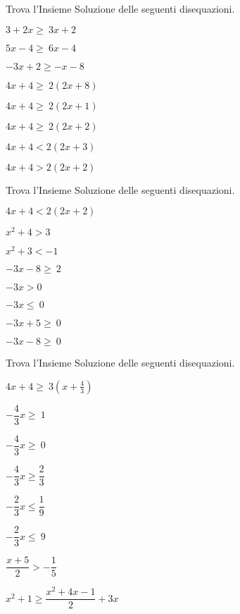 \begin{esercizio}[\Ast]
 \label{ese:21.11}
Trova l'Insieme Soluzione delle seguenti disequazioni.
 \begin{multicols}{2}
 \begin{enumeratea}
 \item \(3+2x\ge~3x+2\)
\item \(5x-4\ge~6x-4\)
\item \(-3x+2\ge -x-8\)
\item \(4x+4\ge~2(2x+8)\)
\item \(4x+4\ge~2(2x+1)\)
\item \(4x+4\ge~2(2x+2)\)
\item \(4x+4<2(2x+3)\)
\item \(4x+4>2(2x+2)\)
\end{enumeratea}
\end{multicols}
\end{esercizio}

\begin{esercizio}[\Ast]
 \label{ese:21.12}
Trova l'Insieme Soluzione delle seguenti disequazioni.
 \begin{multicols}{2}
 \begin{enumeratea}
 \item \(4x+4<2(2x+2)\)
\item \(x^{2}+4>3\)
\item \(x^{2}+3<-1\)
\item \(-3x-8\ge~2\)
\item \(-3x>0\)
\item \(-3x\le~0\)
\item \(-3x+5\ge~0\)
\item \(-3x-8\ge~0\)
\end{enumeratea}
\end{multicols}
\end{esercizio}

\newpage
\begin{esercizio}[\Ast]
 \label{ese:21.13}
Trova l'Insieme Soluzione delle seguenti disequazioni.
 \begin{multicols}{2}
 \begin{enumeratea}
 \item \(4x+4\ge~3\left(x+\frac{4}{3}\right)\)
\item \(-{\dfrac{4}{3}}x\ge~1\)
\item \(-{\dfrac{4}{3}}x\ge~0\)
\item \(-{\dfrac{4}{3}}x\ge \dfrac{2}{3}\)
\item \(-{\dfrac{2}{3}}x\le \dfrac{1}{9}\)
\item \(-{\dfrac{2}{3}}x\le~9\)
\item \(\dfrac{x+5}{2}>-{\dfrac{1}{5}}\)
\item \(x^2+1\ge\dfrac{x^2+4x-1}{2}+3x\)
\end{enumeratea}
\end{multicols}
\end{esercizio}

